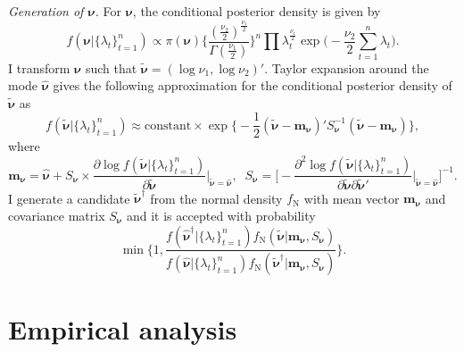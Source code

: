 \documentclass[11pt]{article}
\begin{document}
\vspace{0.5\baselineskip}

\noindent
{\it Generation of $\bm{\nu}$.} 
For $\bm{\nu}$, the conditional posterior density is given by 
\begin{equation}
f(\bm{\nu} |\{\lambda_t\}_{t=1}^n)
\propto \pi(\bm{\nu}) \Bigg\{ \frac{(\frac{\nu_2}{2})^{\frac{\nu_1}{2}}}{\Gamma(\frac{\nu_1}{2})} \Bigg\}^n \prod \lambda_t^{\frac{\nu_1}{2}} \exp\Bigg( -\frac{\nu_2}{2} \sum_{t=1}^n \lambda_t \Bigg). 
\end{equation}
I transform $\bm{\nu}$ such that $\widetilde{\bm{\nu}}=(\log\nu_1, \log\nu_2)'$. 
Taylor expansion around the mode $\widehat{\bm{\nu}}$ gives the following approximation for the conditional posterior density of $\widetilde{\bm{\nu}}$ as 
\begin{equation}
f(\widetilde{\bm{\nu}} |\{\lambda_t\}_{t=1}^n)
\approx \text{constant} \times \exp\bigg\{ -\frac{1}{2}(\widetilde{\bm{\nu}} -\bm{m}_{\bm{\nu}})' S_{\bm{\nu}}^{-1} (\widetilde{\bm{\nu}} -\bm{m}_{\bm{\nu}}) \bigg\}, 
\end{equation}
where 
\begin{equation}
\bm{m}_{\bm{\nu}} =\widehat{\bm{\nu}} + S_{\bm{\nu}} \times\frac{\partial \log f(\widetilde{\bm{\nu}} |\{\lambda_t\}_{t=1}^n)}{\partial\widetilde{\bm{\nu}}}\Bigg|_{\widetilde{\bm{\nu}} =\widehat{\bm{\nu}}}, \;\;
S_{\bm{\nu}} =\Bigg[ -\frac{\partial^2 \log f(\widetilde{\bm{\nu}} |\{\lambda_t\}_{t=1}^n)}{\partial\widetilde{\bm{\nu}}\partial\widetilde{\bm{\nu}}'}\Bigg|_{\widetilde{\bm{\nu}} =\widehat{\bm{\nu}}} 
\Bigg]^{-1}.
\end{equation}
I generate a candidate $\widetilde{\bm{\nu}}^\dagger$ from the normal density $f_{\mathrm{N}}$ with mean vector $\bm{m}_{\bm{\nu}}$ and covariance matrix $S_{\bm{\nu}}$ and it is accepted with probability 
\begin{equation}
\min\bigg\{ 1, \frac{f(\widehat{\bm{\nu}}^\dagger |\{\lambda_t\}_{t=1}^n) f_{\mathrm{N}}(\widetilde{\bm{\nu}} |\bm{m}_{\bm{\nu}}, S_{\bm{\nu}})}{f(\widehat{\bm{\nu}} |\{\lambda_t\}_{t=1}^n) f_{\mathrm{N}}(\widetilde{\bm{\nu}}^\dagger |\bm{m}_{\bm{\nu}}, S_{\bm{\nu}})} \bigg\}. 
\end{equation}

\section{Empirical analysis}
\end{document}
